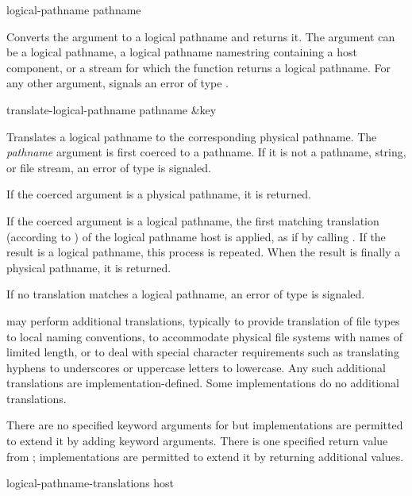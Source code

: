 \begin{newer}
\begin{defun}[Function]
logical-pathname pathname

    Converts the argument to a logical pathname and returns it.  The
    argument can be a logical pathname, a logical pathname namestring
    containing a host component, or a stream for which the 
    function returns a logical pathname.  For any other argument,
     signals an error of type .
\end{defun}

\begin{defun}[Function]
translate-logical-pathname pathname &key

    Translates a logical pathname to the corresponding physical pathname.
    The \emph{pathname} argument is first coerced to a pathname.  If it is not a
    pathname, string, or file stream, an error of type  is
    signaled.

    If the coerced argument is a physical pathname, it is returned.

    If the coerced argument is a logical pathname, the first matching
    translation (according to ) of the logical pathname
    host is applied, as if by calling .  If the result is
    a logical pathname, this process is repeated.  When the result is
    finally a physical pathname, it is returned.

    If no translation matches a logical pathname,
    an error of type  is signaled.

     may perform additional translations,
    typically to provide translation of file types to local naming
    conventions, to accommodate physical file systems with names of limited length,
    or to deal with special character requirements such as
    translating hyphens to underscores or uppercase letters to lowercase.
    Any such additional translations are implementation-defined.  Some
    implementations do no additional translations.

    There are no specified keyword arguments for
     but implementations are permitted to extend
    it by adding keyword arguments.  There is one specified return value
    from ; implementations are permitted to
    extend it by returning additional values.
\end{defun}

\begin{defun}[Function]
logical-pathname-translations host


\end{defun}
\end{newer}
